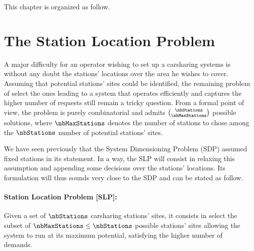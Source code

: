 \begin{bibunit}[ieeetr]
\medskip
This chapter is organized as follow.


\section{The Station Location Problem}
A major difficulty for an operator wishing to set up a carsharing systems is without any doubt the stations' locations over the area he wishes to cover.
Assuming that potential stations' sites could be identified, the remaining problem of select the ones leading to a system that operates efficiently and captures the higher number of requests still remain a tricky question.
From a formal point of view, the problem is purely combinatorial and admits $\binom{\nbStations}{\nbMaxStations}$ possible solutions, where $\nbMaxStations$ denotes the number of stations to chose among the $\nbStations$ number of potential stations' sites.


\medskip
We have seen previously that the System Dimensioning Problem (SDP) assumed fixed stations in its statement.
In a way, the SLP will consist in relaxing this assumption and appending some decisions over the stations' locations.
Its formulation will thus sounds very close to the SDP and can be stated as follow.

\paragraph{Station Location Problem [SLP]:}
Given a set of $\nbStations$ carsharing stations' sites, it consists in select the subset of $\nbMaxStations \leq \nbStations$ possible stations' sites allowing the system to run at its maximum potential, \ie satisfying the higher number of demands.


\end{bibunit}
